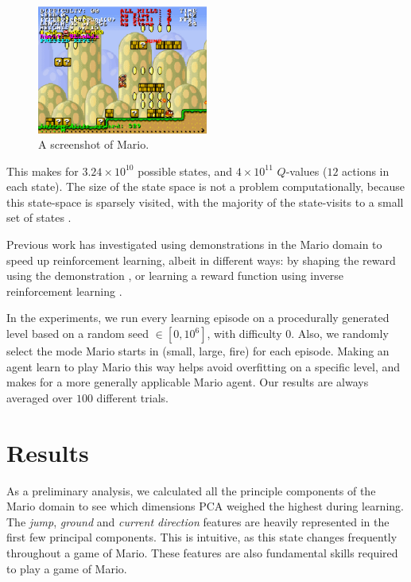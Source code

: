 \documentclass[twoside,11pt]{article}
\begin{document}
\begin{figure}[h!]
  \centering
      \includegraphics[width=0.5\textwidth]{Mario}
  \caption{A screenshot of Mario.}
  \label{fig:mario}
\end{figure}

This makes for $3.24 \times 10^{10}$ possible states, and $4 \times 10^{11}$ $Q$-values ($12$ actions in each state). The size of the state space is not a problem computationally, because this state-space is sparsely visited, with the majority of the state-visits to a small set of states \citep{liao2012cs229}.

Previous work has investigated using demonstrations in the Mario domain to speed up reinforcement learning, albeit in different ways: by shaping the reward using the demonstration \citep{Brys2015IJCAI}, or learning a reward function using inverse reinforcement learning \citep{lee2014learning}.

In the experiments, we run every learning episode on a procedurally generated level based on a random seed $\in [0,10^6]$, with difficulty $0$. Also, we randomly select the mode Mario starts in (small, large, fire) for each episode. Making an agent learn to play Mario this way helps avoid overfitting on a specific level, and makes for a more generally applicable Mario agent. Our results are always averaged over $100$ different trials.


\section{Results}

As a preliminary analysis, we calculated all the principle components of the Mario domain to see which dimensions PCA weighed the highest during learning. The \textit{jump}, \textit{ground} and \textit{current direction} features are heavily represented in the first few principal components. This is intuitive, as this state changes frequently throughout a game of Mario. These features are also fundamental skills required to play a game of Mario. 
\end{document}
